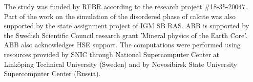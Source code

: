 \documentclass[journal=jacsat,manuscript=article]{achemso}
\begin{document}
\begin{acknowledgement}
The study was funded by RFBR according to the research project \#18-35-20047. 
Part of the work on the simulation of the disordered phase of calcite was also supported by the state assignment project of IGM SB RAS. 
ABB is supported by the Swedish Scientific Council research grant 'Mineral physics of the Earth Core'. 
ABB also acknowledges HSE support.
The computations were performed using resources provided by SNIC through National Supercomputer Center at Link\"{o}ping Technical University (Sweden) and by Novosibirsk State University Supercomputer Center (Russia).
\end{acknowledgement}


%
\end{document}
